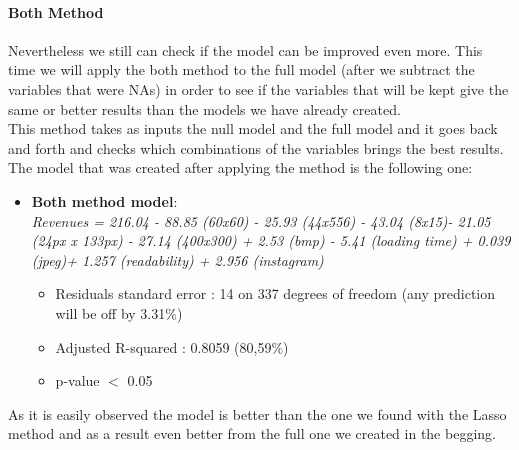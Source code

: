 \documentclass{article}
\begin{document}
\paragraph{Both Method}
Nevertheless we still can check if the model can be improved even more. This time we will apply the both method to the full model (after we subtract the variables that were NAs) in order to see if the variables that will be kept give the same or better results than the models we have already created.\\
This method takes as inputs the null model and the full model and it goes back and forth and checks which combinations of the variables brings the best results. The model that was created after applying the method is the following one:\\
\begin{itemize}
\item \textbf{Both method model}:\\
\textit{Revenues = 216.04 - 88.85 (60x60) - 25.93 (44x556) - 43.04 (8x15)- 21.05 (24px x 133px) - 27.14 (400x300) + 2.53 (bmp) - 5.41 (loading time) + 0.039 (jpeg)+ 1.257 (readability) + 2.956 (instagram) }
\begin{itemize}
\item Residuals standard error : 14 on 337 degrees of freedom (any prediction will be off by 3.31\%)
\item Adjusted R-squared : 0.8059 (80,59\%)
\item p-value $<$ 0.05
\end{itemize}
\end{itemize}
As it is easily observed the model is better than the one we found with the Lasso method and as a result even better from the full one we created in the begging.
\end{document}
